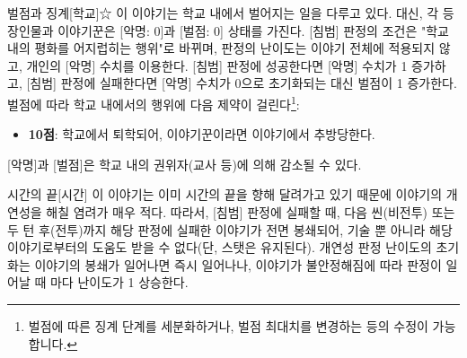 \documentclass{report}
\begin{document}
	\begin{story}{벌점과 징계}{[학교]☆}
		이 이야기는 학교 내에서 벌어지는 일을 다루고 있다. 대신, 각 등장인물과 이야기꾼은 [악명: 0]과 [벌점: 0] 상태를 가진다. [침범] 판정의 조건은 "학교 내의 평화를 어지럽히는 행위"로 바뀌며, 판정의 난이도는 이야기 전체에 적용되지 않고, 개인의 [악명] 수치를 이용한다. [침범] 판정에 성공한다면 [악명] 수치가 1 증가하고, [침범] 판정에 실패한다면 [악명] 수치가 0으로 초기화되는 대신 벌점이 1 증가한다. 벌점에 따라 학교 내에서의 행위에 다음 제약이 걸린다\footnote{벌점에 따른 징계 단계를 세분화하거나, 벌점 최대치를 변경하는 등의 수정이 가능합니다.}:
		\begin{itemize}
			\item \textbf{10점}: 학교에서 퇴학되어, 이야기꾼이라면 이야기에서 추방당한다.
		\end{itemize}
		[악명]과 [벌점]은 학교 내의 권위자(교사 등)에 의해 감소될 수 있다.
	\end{story}
	
	\begin{story}{시간의 끝}{[시간]}
		이 이야기는 이미 시간의 끝을 향해 달려가고 있기 때문에 이야기의 개연성을 해칠 염려가 매우 적다. 따라서, [침범] 판정에 실패할 때, 다음 씬(비전투) 또는 두 턴 후(전투)까지 해당 판정에 실패한 이야기가 전면 봉쇄되어, 기술 뿐 아니라 해당 이야기로부터의 도움도 받을 수 없다(단, 스탯은 유지된다). 개연성 판정 난이도의 초기화는 이야기의 봉쇄가 일어나면 즉시 일어나나, 이야기가 불안정해짐에 따라 판정이 일어날 때 마다 난이도가 1 상승한다.
	\end{story}
\end{document}

